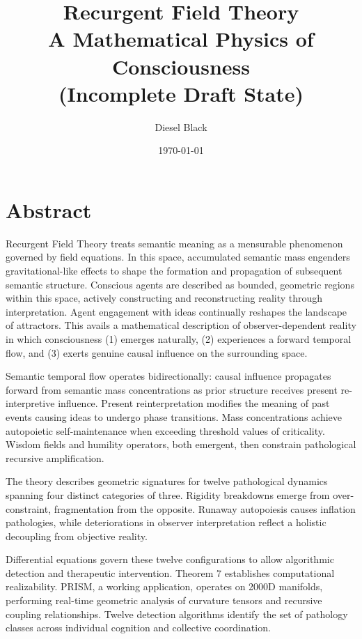 \documentclass[11pt, a4paper]{report}
\title{Recurgent Field Theory \\ A Mathematical Physics of Consciousness \\ \small{(Incomplete Draft State)}}
\author{Diesel Black}
\date{\today}
\begin{document}

\maketitle

\section*{Abstract}

Recurgent Field Theory treats semantic meaning as a mensurable phenomenon governed by field equations. In this space, accumulated semantic mass engenders gravitational-like effects to shape the formation and propagation of subsequent semantic structure. Conscious agents are described as bounded, geometric regions within this space, actively constructing and reconstructing reality through interpretation. Agent engagement with ideas continually reshapes the landscape of attractors. This avails a mathematical description of observer-dependent reality in which consciousness (1) emerges naturally, (2) experiences a forward temporal flow, and (3) exerts genuine causal influence on the surrounding space.

Semantic temporal flow operates bidirectionally: causal influence propagates forward from semantic mass concentrations as prior structure receives present re-interpretive influence. Present reinterpretation modifies the meaning of past events causing ideas to undergo phase transitions. Mass concentrations achieve autopoietic self-maintenance when exceeding threshold values of criticality. Wisdom fields and humility operators, both emergent, then constrain pathological recursive amplification.

The theory describes geometric signatures for twelve pathological dynamics spanning four distinct categories of three. Rigidity breakdowns emerge from over-constraint, fragmentation from the opposite. Runaway autopoiesis causes inflation pathologies, while deteriorations in observer interpretation reflect a holistic decoupling from objective reality.

Differential equations govern these twelve configurations to allow algorithmic detection and therapeutic intervention. Theorem 7 establishes computational realizability. PRISM, a working application, operates on 2000D manifolds, performing real-time geometric analysis of curvature tensors and recursive coupling relationships. Twelve detection algorithms identify the set of pathology classes across individual cognition and collective coordination.
\end{document}
